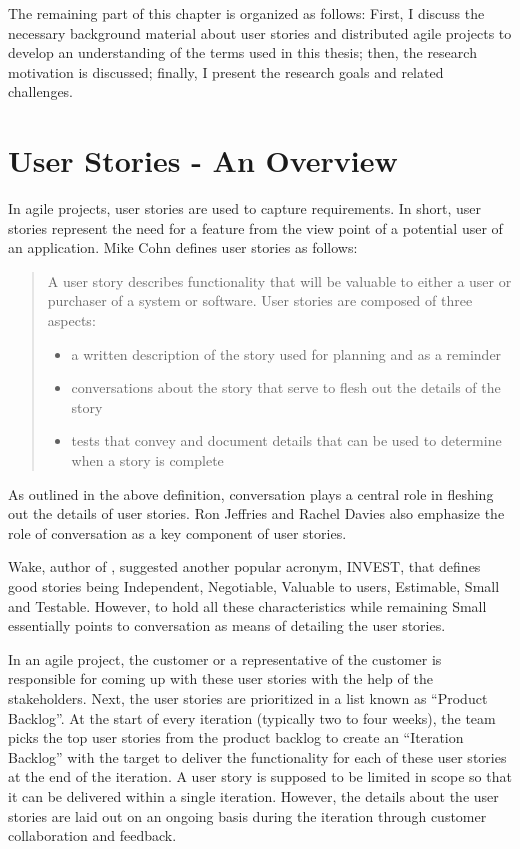 The remaining part of this chapter is organized as follows: First, I discuss the necessary background material about user stories and distributed agile projects to develop an understanding of the terms used in this thesis; then, the research motivation is discussed; finally, I present the research goals and related challenges.

\section{User Stories - An Overview}
In agile projects, user stories are used to capture requirements. In short, user stories represent the need for a feature from the view point of a potential user of an application. Mike Cohn \cite{user_stories_applied} defines user stories as follows:\\

\begin{quote}
	A user story describes functionality that will be valuable to either a user or purchaser of a system or software. User stories are composed of three aspects:
	\begin{itemize}
		\item a written description of the story used for planning and as a reminder
		\item conversations about the story that serve to flesh out the details of the story
		\item tests that convey and document details that can be used to determine when a story is complete
	\end{itemize}
\end{quote}

As outlined in the above definition, conversation plays a central role in fleshing out the details of user stories. Ron Jeffries \cite{ron_jeffries} and Rachel Davies\cite{rachel_davies} also emphasize the role of conversation as a key component of user stories.

Wake, author of \cite{bill_wake}, suggested another popular acronym, INVEST, that defines good stories being Independent, Negotiable, Valuable to users, Estimable, Small and Testable. However, to hold all these characteristics while remaining Small essentially points to conversation as means of detailing the user stories.

In an agile project, the customer or a representative of the customer is responsible for coming up with these user stories with the help of the stakeholders. Next, the user stories are prioritized in a list known as ``Product Backlog''. At the start of every iteration (typically two to four weeks), the team picks the top user stories from the product backlog to create an ``Iteration Backlog'' with the target to deliver the functionality for each of these user stories at the end of the iteration. A user story is supposed to be limited in scope so that it can be delivered within a single iteration. However, the details about the user stories are laid out on an ongoing basis during the iteration through customer collaboration and feedback.

